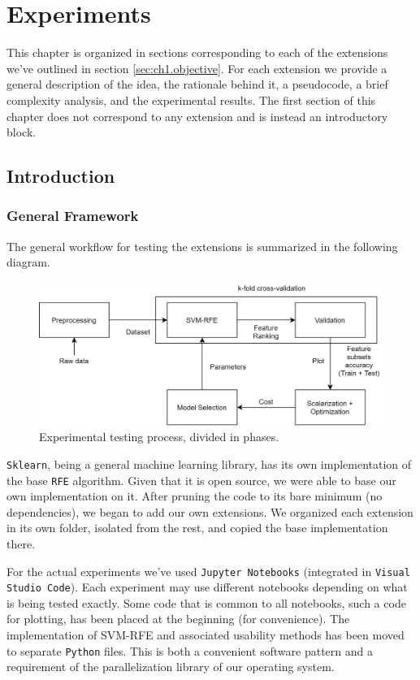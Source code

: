 \chapter{Experiments}
\label{Chapter5}

This chapter is organized in sections corresponding to each of the extensions we've outlined in section \ref{sec:ch1.objective}. For each extension we provide a general description of the idea, the rationale behind it, a pseudocode, a brief complexity analysis, and the experimental results. The first section of this chapter does not correspond to any extension and is instead an introductory block.

\section{Introduction}

\subsection{General Framework}

The general workflow for testing the extensions is summarized in the following diagram.

\begin{figure}[h]
    \centering
    \includegraphics[width=0.8\linewidth]{img/ch5/diag.png}
    \caption{Experimental testing process, divided in phases.}
    \label{fig:ch5.diag}
\end{figure}

\texttt{Sklearn}, being a general machine learning library, has its own implementation of the base \texttt{RFE} algorithm. Given that it is open source, we were able to base our own implementation on it. After pruning the code to its bare minimum (no dep\-en\-den\-cies), we began to add our own extensions. We organized each extension in its own folder, isolated from the rest, and copied the base implementation there.

For the actual experiments we've used \texttt{Jupyter Notebooks} (integrated in \texttt{Visual Studio Code}). Each experiment may use different notebooks depending on what is being tested exactly. Some code that is common to all notebooks, such a code for plotting, has been placed at the beginning (for convenience). The implementation of SVM-RFE and associated usability methods has been moved to separate \texttt{Python} files. This is both a convenient software pattern and a requirement of the parallelization library of our operating system.

